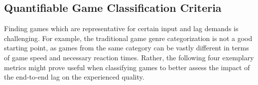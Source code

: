 


\subsection{Quantifiable Game Classification Criteria}


Finding games which are representative for certain input and lag demands is challenging.
For example, the traditional game genre categorization is not a good starting point, as games from the same category can be vastly different in terms of game speed and necessary reaction times.
Rather, the following four exemplary metrics might prove useful when classifying games to better assess the impact of the end-to-end lag on the experienced quality.

